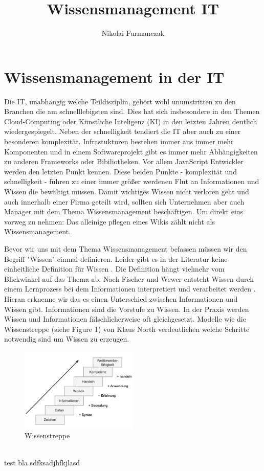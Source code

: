\documentclass{article}
\title{Wissensmanagement IT}
\author{Nikolai Furmanczak}
\begin{document}
\section*{Wissensmanagement in der IT}
Die IT, unabhängig welche Teildisziplin, gehört wohl unumstritten zu den Branchen die am schnelllebigsten sind. Dies hat sich insbesondere in den Themen Cloud-Computing oder Künstliche Inteligenz (KI) in den letzten Jahren deutlich wiedergespiegelt. Neben der schnelligkeit tendiert die IT aber auch zu einer besonderen komplexität. Infrastukturen bestehen immer aus immer mehr Komponenten und in einem Softwareprojekt gibt es immer mehr Abhängigkeiten zu anderen Frameworks oder Bibiliotheken. Vor allem JavaScript Entwickler werden den letzten Punkt kennen. Diese beiden Punkte - komplexität und schnelligkeit - führen zu einer immer größer werdenen Flut an Informationen und Wissen die  bewältigt müssen. Damit wichtiges Wissen nicht verloren geht und auch innerhalb einer Firma geteilt wird, sollten sich Unternehmen aber auch Manager mit dem Thema Wissensmanagement beschäftigen. Um direkt eins vorweg zu nehmen: Das alleinige pflegen eines Wikis zählt nicht als Wissensmanagement.\par
\bigskip 
Bevor wir uns mit dem Thema Wissensmanagement befassen müssen wir den Begriff "Wissen" einmal definieren. Leider gibt es in der Literatur keine einheitliche Definition für Wissen \parencite{ReinmannRothmeierMandl2000}. Die Definition hängt vielmehr vom Blickwinkel auf das Thema ab. Nach Fischer und Wewer entsteht Wissen durch einem Lernprozess bei dem Informationen interpretiert und verarbeitet werden \parencite*[p. 2]{FischerWewer2021}. Hieran erknenne wir das es einen Unterschied zwischen Informationen und Wissen gibt. Informationen sind die Vorstufe zu Wissen. In der Praxis werden Wissen und Informationen fälschlicherweise oft gleichgesetzt. Modelle wie die Wissenstreppe (siehe Figure 1) von Klaus North verdeutlichen welche Schritte notwendig sind um Wissen zu erzeugen.
\begin{figure}
    \centering
    \includegraphics[width=0.5\textwidth]{images/wissenstreppe.png}
    \caption{Wissenstreppe}
    \label{fig:meinBild}
  \end{figure}
\\
test
bla sdfksadjhfkjlasd
\printbibliography
\end{document}
